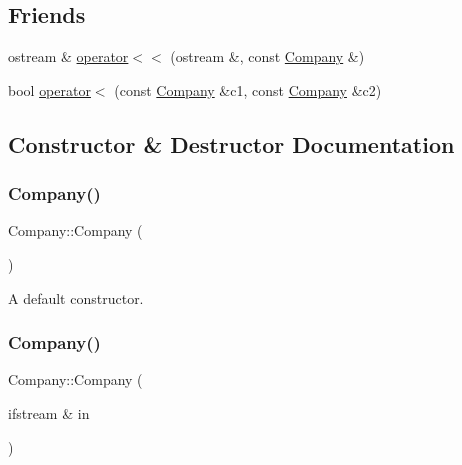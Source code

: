\subsection*{Friends}
\begin{DoxyCompactItemize}
\item 
ostream \& \hyperlink{class_company_a8df46a57b8a540b441aa9ee118fe2cc4}{operator$<$$<$} (ostream \&, const \hyperlink{class_company}{Company} \&)
\item 
bool \hyperlink{class_company_ad929126732815ca48c4a724b0f8c61f0}{operator$<$} (const \hyperlink{class_company}{Company} \&c1, const \hyperlink{class_company}{Company} \&c2)
\end{DoxyCompactItemize}


\subsection{Constructor \& Destructor Documentation}
\mbox{\label{class_company_a14c30a07bc6ce43b9a8e16415ab826e9}} 
\subsubsection{\texorpdfstring{Company()}{Company()}\hspace{0.1cm}{\footnotesize\ttfamily [1/3]}}
{\footnotesize\ttfamily Company\+::\+Company (\begin{DoxyParamCaption}{ }\end{DoxyParamCaption})\hspace{0.3cm}{\ttfamily [default]}}

A default constructor. \mbox{\label{class_company_a0e6ef245a534b48cdb0c51cd66999455}} 
\subsubsection{\texorpdfstring{Company()}{Company()}\hspace{0.1cm}{\footnotesize\ttfamily [2/3]}}
{\footnotesize\ttfamily Company\+::\+Company (\begin{DoxyParamCaption}\item[{ifstream \&}]{in }\end{DoxyParamCaption})}

